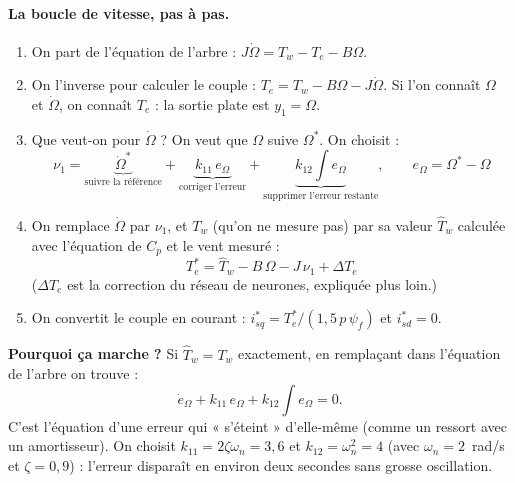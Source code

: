 \documentclass[11pt,a4paper]{article}
\begin{document}
\paragraph{La boucle de vitesse, pas à pas.}
\begin{enumerate}
\item On part de l'équation de l'arbre : $J\dot\Omega = T_w - T_e - B\Omega$.
\item On l'inverse pour calculer le couple : $T_e = T_w - B\Omega - J\dot\Omega$.
Si l'on connaît $\Omega$ et $\dot\Omega$, on connaît $T_e$ : la sortie plate est $y_1=\Omega$.
\item Que veut-on pour $\dot\Omega$ ? On veut que $\Omega$ suive $\Omega^*$. On choisit :
\[
\nu_1 = \underbrace{\dot\Omega^*}_{\text{suivre la référence}} + \underbrace{k_{11}\,e_\Omega}_{\text{corriger l'erreur}} + \underbrace{k_{12}\!\int\! e_\Omega}_{\text{supprimer l'erreur restante}},
\qquad e_\Omega = \Omega^* - \Omega
\]
\item On remplace $\dot\Omega$ par $\nu_1$, et $T_w$ (qu'on ne mesure pas) par sa valeur $\hat T_w$ calculée
avec l'équation de $C_p$ et le vent mesuré :
\begin{equation}
\boxed{T_e^* = \hat T_w - B\,\Omega - J\,\nu_1 + \Delta T_e}
\end{equation}
($\Delta T_e$ est la correction du réseau de neurones, expliquée plus loin.)
\item On convertit le couple en courant : $i_{sq}^* = T_e^*/(1{,}5\,p\,\psi_f)$ et $i_{sd}^*=0$.
\end{enumerate}
\textbf{Pourquoi ça marche ?} Si $\hat T_w = T_w$ exactement, en remplaçant dans l'équation de l'arbre on trouve :
\[
\dot e_\Omega + k_{11}\,e_\Omega + k_{12}\!\int\! e_\Omega = 0 .
\]
C'est l'équation d'une erreur qui « s'éteint » d'elle-même (comme un ressort avec un amortisseur). On choisit
$k_{11}=2\zeta\omega_n=3{,}6$ et $k_{12}=\omega_n^2=4$ (avec $\omega_n = 2$~rad/s et $\zeta=0{,}9$) : l'erreur
disparaît en environ deux secondes sans grosse oscillation.
\end{document}
